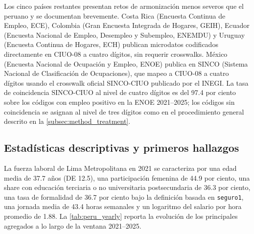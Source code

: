 Los cinco pa\'{i}ses restantes presentan retos de armonizaci\'{o}n menos severos que el peruano y se documentan brevemente. Costa Rica (Encuesta Continua de Empleo, ECE), Colombia (Gran Encuesta Integrada de Hogares, GEIH), Ecuador (Encuesta Nacional de Empleo, Desempleo y Subempleo, ENEMDU) y Uruguay (Encuesta Continua de Hogares, ECH) publican microdatos codificados directamente en CIUO-08 a cuatro d\'{i}gitos, sin requerir crosswalks. M\'{e}xico (Encuesta Nacional de Ocupaci\'{o}n y Empleo, ENOE) publica en SINCO (Sistema Nacional de Clasificaci\'{o}n de Ocupaciones), que mapeo a CIUO-08 a cuatro d\'{i}gitos usando el crosswalk oficial SINCO-CIUO publicado por el INEGI. La tasa de coincidencia SINCO-CIUO al nivel de cuatro d\'{i}gitos es del 97.4 por ciento sobre los c\'{o}digos con empleo positivo en la ENOE 2021--2025; los c\'{o}digos sin coincidencia se asignan al nivel de tres d\'{i}gitos como en el procedimiento general descrito en la \cref{subsec:method_treatment}.




\subsection{Estad\'{i}sticas descriptivas y primeros hallazgos}
\label{subsec:data_descriptives}

La fuerza laboral de Lima Metropolitana en 2021 se caracteriza por una edad media de 37.7 a\~{n}os (DE 12.5), una participaci\'{o}n femenina de 44.9 por ciento, una share con educaci\'{o}n terciaria o no universitaria postsecundaria de 36.3 por ciento, una tasa de formalidad de 36.7 por ciento bajo la definici\'{o}n basada en \texttt{seguro1}, una jornada media de 43.4 horas semanales y un logaritmo del salario por hora promedio de 1.88. La \cref{tab:peru_yearly} reporta la evoluci\'{o}n de los principales agregados a lo largo de la ventana 2021--2025.


